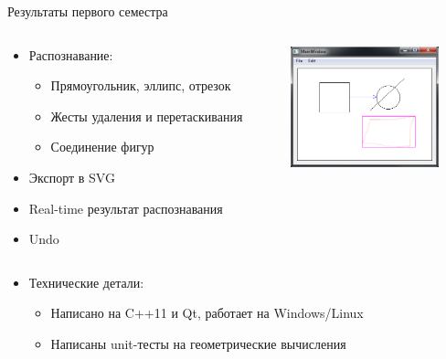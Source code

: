 \documentclass[utf8,xcolor=table]{beamer}
\begin{document}
\begin{frame}[t]{Результаты первого семестра}
  \begin{columns}[T]
  \begin{column}{.6\textwidth}
    \begin{itemize}
    \item Распознавание:
      \begin{itemize}
      \item Прямоугольник, эллипс, отрезок
      \item Жесты удаления и перетаскивания
      \item Соединение фигур
      \end{itemize}
    \item Экспорт в SVG
    \item Real-time результат распознавания
    \item Undo
    \end{itemize}
  \end{column}
  \begin{column}{.4\textwidth}
    \includegraphics[height=3.5cm]{demo_scr}
  \end{column}
  \end{columns}
  \begin{itemize}
  \item Технические детали:
    \begin{itemize}
    \item Написано на C++11 и Qt, работает на Windows/Linux
    \item Написаны unit-тесты на геометрические вычисления
    \end{itemize}
  \end{itemize}
\end{frame}
\end{document}
